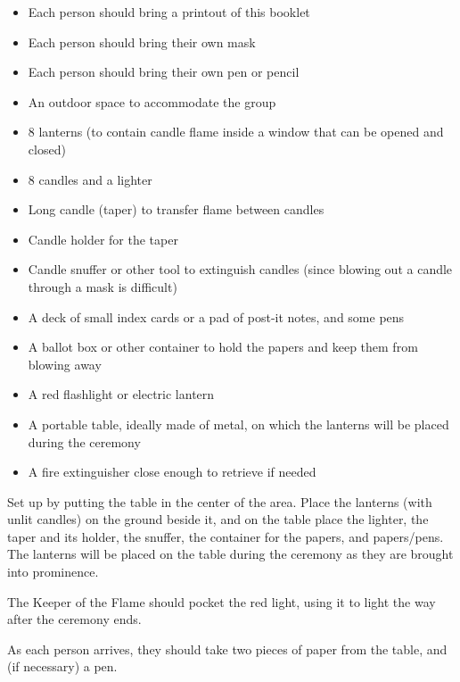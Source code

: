 \documentclass{article}
\begin{document}
{\begin{itemize} \itemsep0pt \parskip0pt 
	\item Each person should bring a printout of this booklet
	\item Each person should bring their own mask
	\item Each person should bring their own pen or pencil
	\item An outdoor space to accommodate the group
	\item 8 lanterns (to contain candle flame inside a window that can be opened and closed)
	\item 8 candles and a lighter
	\item Long candle (taper) to transfer flame between candles
	\item Candle holder for the taper
	\item Candle snuffer or other tool to extinguish candles (since blowing out a candle through a mask is difficult)
	\item A deck of small index cards or a pad of post-it notes, and some pens
	\item A ballot box or other container to hold the papers and keep them from
blowing away
	\item A red flashlight or electric lantern
	\item A portable table, ideally made of metal, on which the lanterns will be placed during the ceremony
	\item A fire extinguisher close enough to retrieve if needed
\end{itemize}

Set up by putting the table in the center of the area. Place the lanterns
(with unlit candles) on the ground beside it, and on the table place the
lighter, the taper and its holder, the snuffer, the container for the papers,
and papers/pens. The lanterns will be placed on the table during the ceremony
as they are brought into prominence.

The Keeper of the Flame should pocket the red light, using it to light the way
after the ceremony ends.

As each person arrives, they should take two pieces of paper from the table,
and (if necessary) a pen.

} %
\end{document}
